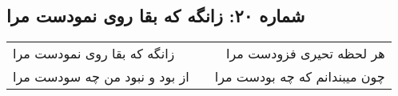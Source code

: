 \begin{center}
\section*{شماره ۲۰: زانگه که بقا روی نمودست مرا}
\label{sec:020}
\begin{longtable}{l p{0.5cm} r}
زانگه که بقا روی نمودست مرا
&&
هر لحظه تحیری فزودست مرا
\\
از بود و نبود من چه سودست مرا
&&
چون میبندانم که چه بودست مرا
\\
\end{longtable}
\end{center}
